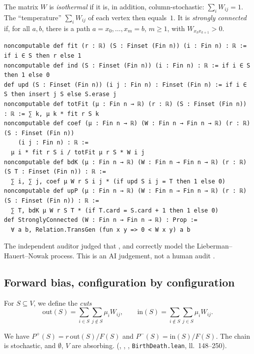 \begin{definition}
The matrix $W$ is \emph{isothermal} if it is, in addition, column-stochastic: $\sum_iW_{ij}=1$. The
``temperature'' $\sum_iW_{ij}$ of each vertex then equals~$1$. It is \emph{strongly connected} if, for all
$a,b$, there is a path $a=x_0,\dots,x_m=b$, $m\ge1$, with $W_{x_kx_{k+1}}>0$.
\end{definition}

\begin{leanbox}
\begin{lstlisting}[language=Lean]
noncomputable def fit (r : ℝ) (S : Finset (Fin n)) (i : Fin n) : ℝ := if i ∈ S then r else 1
noncomputable def ind (S : Finset (Fin n)) (i : Fin n) : ℝ := if i ∈ S then 1 else 0
def upd (S : Finset (Fin n)) (i j : Fin n) : Finset (Fin n) := if i ∈ S then insert j S else S.erase j
noncomputable def totFit (μ : Fin n → ℝ) (r : ℝ) (S : Finset (Fin n)) : ℝ := ∑ k, μ k * fit r S k
noncomputable def coef (μ : Fin n → ℝ) (W : Fin n → Fin n → ℝ) (r : ℝ) (S : Finset (Fin n))
    (i j : Fin n) : ℝ :=
  μ i * fit r S i / totFit μ r S * W i j
noncomputable def bdK (μ : Fin n → ℝ) (W : Fin n → Fin n → ℝ) (r : ℝ) (S T : Finset (Fin n)) : ℝ :=
  ∑ i, ∑ j, coef μ W r S i j * (if upd S i j = T then 1 else 0)
noncomputable def upP (μ : Fin n → ℝ) (W : Fin n → Fin n → ℝ) (r : ℝ) (S : Finset (Fin n)) : ℝ :=
  ∑ T, bdK μ W r S T * (if T.card = S.card + 1 then 1 else 0)
def StronglyConnected (W : Fin n → Fin n → ℝ) : Prop :=
  ∀ a b, Relation.TransGen (fun x y => 0 < W x y) a b
\end{lstlisting}
The independent auditor judged that ,  and  correctly model the
Lieberman--Hauert--Nowak process. This is an AI judgement, not a human audit \tierC.
\end{leanbox}

\subsection{Forward bias, configuration by configuration}
For $S\subseteq V$, we define the \emph{cuts}
\[
\mathrm{out}(S)=\sum_{i\in S}\sum_{j\notin S}\mu_iW_{ij},\qquad \mathrm{in}(S)=\sum_{i\notin S}\sum_{j\in S}\mu_iW_{ij}.
\]

\begin{lemma}\label{ch4:lem:cuts}
We have $P^{+}(S)=r\,\mathrm{out}(S)/F(S)$ and $P^{-}(S)=\mathrm{in}(S)/F(S)$. The chain is stochastic, and
$\emptyset$, $V$ are absorbing. \tierA{} (, , ,
\texttt{BirthDeath.lean}, ll.~148--250).
\end{lemma}

